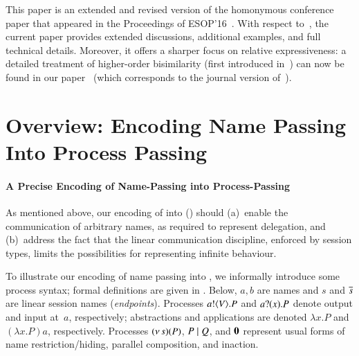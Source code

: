 \documentclass[preprint,11pt]{elsarticle}
\begin{document}
{This paper is an extended and revised version of the homonymous conference paper that appeared in the Proceedings of ESOP'16~\cite{DBLP:conf/esop/KouzapasPY16}.
With respect to~\cite{DBLP:conf/esop/KouzapasPY16}, the current paper 
provides extended discussions, additional examples, and full technical details. 
Moreover, it offers a sharper focus on relative expressiveness:
a detailed treatment of higher-order bisimilarity
(first introduced in~\cite{DBLP:conf/esop/KouzapasPY16}) can now be found in our paper~\cite{KouzapasPY17} (which corresponds to the journal version of~\cite{characteristic_bis}).


\section{Overview: Encoding Name Passing Into Process Passing}
\label{sec:overview}
%
\paragraph{A Precise Encoding of Name-Passing into Process-Passing}
As mentioned above, 
our encoding of \HOp into \HO () should 
(a)~enable the communication of arbitrary names, as required to represent delegation,
and 
(b)~address the fact that the linear communication discipline, enforced by session types, limits the 
possibilities for representing infinite behaviour. 

To illustrate our encoding of name passing into \HO, we informally introduce some process syntax; formal definitions are given in .
Below, 
$a,b$ are names and $s$ and $\overline{s}$ are 
linear session names (\emph{endpoints}).
Processes $a ! \langle V \rangle . P$ and 
$a ? (x) . P$ denote output and input at~$a$, respectively;   
abstractions and applications are denoted
$\lambda x.P$ and $(\lambda x.P)a$, respectively. 
Processes %
$(\nu\, s)(P)$, $P \;|\; Q$, and $\mathbf{0}$ represent usual forms of name restriction/hiding, parallel composition, and inaction. 

}
\end{document}
